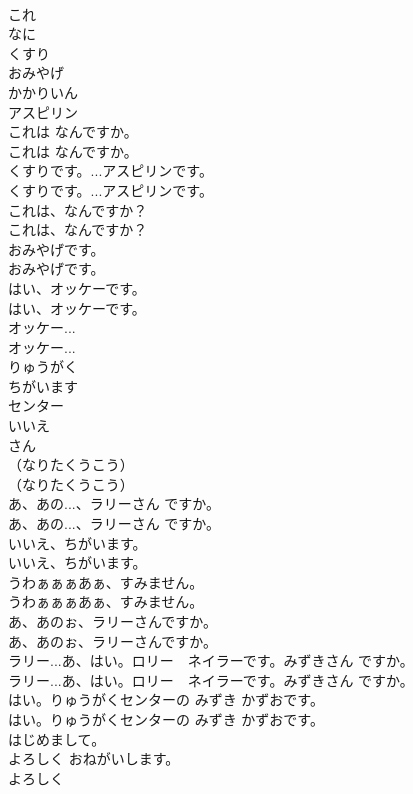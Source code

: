 \documentclass[8pt]{extreport}
\begin{document}
\begin{CJK}{UTF8}{min}
\\	これ
\\	なに
\\	くすり
\\	おみやげ
\\	かかりいん
\\	アスピリン
\\	これは なんですか。	
\\	これは なんですか。 
\\	くすりです。...アスピリンです。	
\\	くすりです。...アスピリンです。 
\\	これは、なんですか？	
\\	これは、なんですか？ 
\\	おみやげです。	
\\	おみやげです。 
\\	はい、オッケーです。	
\\	はい、オッケーです。 
\\	オッケー...	
\\	オッケー... 
\\	りゅうがく
\\	ちがいます
\\	センター
\\	いいえ
\\	さん
\\	（なりたくうこう）	
\\	（なりたくうこう） 
\\	あ、あの...、ラリーさん ですか。	
\\	あ、あの...、ラリーさん ですか。 
\\	いいえ、ちがいます。	
\\	いいえ、ちがいます。 
\\	うわぁぁぁあぁ、すみません。	
\\	うわぁぁぁあぁ、すみません。 
\\	あ、あのぉ、ラリーさんですか。	
\\	あ、あのぉ、ラリーさんですか。 
\\	ラリー...あ、はい。ロリー　ネイラーです。みずきさん ですか。	
\\	ラリー...あ、はい。ロリー　ネイラーです。みずきさん ですか。 
\\	はい。りゅうがくセンターの みずき かずおです。	
\\	はい。りゅうがくセンターの みずき かずおです。 
\\	はじめまして。
\\	よろしく おねがいします。
\\	よろしく

\end{CJK}
\end{document}
